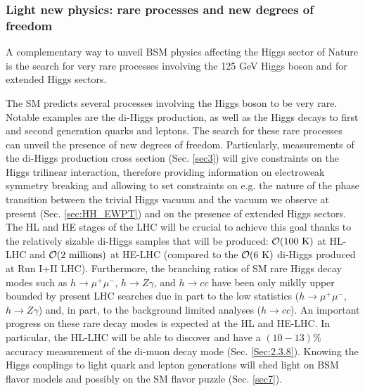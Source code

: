 \subsubsection{Light new physics: rare processes and new degrees of freedom}\label{sec:BSMintro}
A complementary way to unveil BSM physics affecting the Higgs sector of Nature is the search for very rare processes involving the 125 GeV Higgs boson and for extended Higgs sectors. 

The SM predicts several processes involving the Higgs boson to be very rare. Notable examples are the di-Higgs production, as well as the Higgs decays to first and second generation quarks and leptons. The search for these rare processes can unveil the presence of new degrees of freedom. Particularly, measurements of the di-Higgs production cross section (Sec. \ref{sec3}) will give constraints on the Higgs trilinear interaction, therefore providing information on electroweak symmetry breaking and allowing to set constraints on e.g. the nature of the phase transition between the trivial Higgs vacuum and the vacuum we observe at present (Sec. \ref{sec:HH_EWPT}) and on the presence of extended Higgs sectors. The HL and HE stages of the LHC will be crucial to achieve this goal thanks to the relatively sizable di-Higgs samples that will be produced: $\mathcal O(100~{\rm{K}})$ at HL-LHC and $\mathcal O(2~{\rm{millions}})$ at HE-LHC (compared to the $\mathcal O(6~{\rm{K}})$ di-Higgs produced at Run I+II LHC). Furthermore, the branching ratios of SM rare Higgs decay modes such as $h\to\mu^+\mu^-$, $h\to Z\gamma$, and $h\to cc$ have been only mildly upper bounded by present LHC searches due in part to the low statistics ($h\to\mu^+\mu^-$, $h\to Z\gamma$) and, in part, to the background limited analyses ($h\to cc$). An important progress on these rare decay modes is expected at the HL and HE-LHC. In particular, the HL-LHC will be able to discover and have a $(10-13)\%$ accuracy measurement of the di-muon decay mode (Sec. \ref{Sec:2.3.8}). Knowing the Higgs couplings to light quark and lepton generations will shed light on BSM flavor models and possibly on the SM flavor puzzle (Sec. \ref{sec7}).

